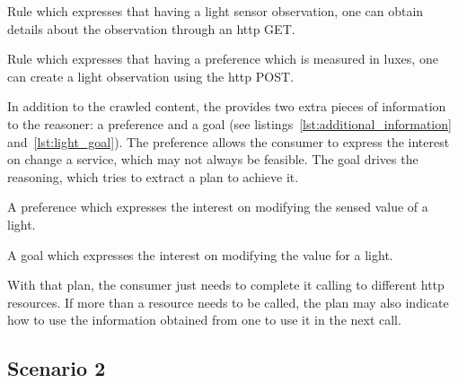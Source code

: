 \begin{listing}
  
  \caption{Rule which expresses that having a light sensor observation, one can obtain details about the observation through an \acs{http} GET.}
  \label{lst:measure_descget}
\end{listing}

\begin{listing}
  
  \caption{Rule which expresses that having a preference which is measured in luxes, one can create a light observation using the \acs{http} POST.}
  \label{lst:light_descpost}
\end{listing}


In addition to the crawled content, the \nodeb{} provides two extra pieces of information to the reasoner: a preference and a goal (see listings~\ref{lst:additional_information} and~\ref{lst:light_goal}).
The preference allows the consumer to express the interest on change a service, which may not always be feasible.
The goal drives the reasoning, which tries to extract a plan to achieve it.

\begin{listing}
  
  \caption{A preference which expresses the interest on modifying the sensed value of a light.}
  \label{lst:additional_information}
\end{listing}

\begin{listing}
  
  \caption{A goal which expresses the interest on modifying the value for a light.}
  \label{lst:light_goal}
\end{listing}

With that plan, the consumer just needs to complete it calling to different \acs{http} resources.
If more than a resource needs to be called, the plan may also indicate how to use the information obtained from one to use it in the next call.


\subsection{Scenario 2}
\label{sec:actuation_scn2}


